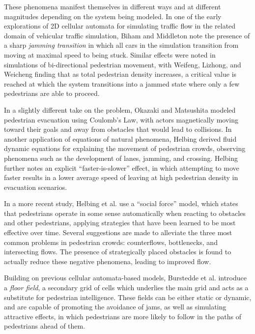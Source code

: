 \documentclass[12pt]{article}
\begin{document}
These phenomena manifest themselves in different ways and at different
magnitudes depending on the system being modeled. In one of the early
explorations of 2D cellular automata for simulating traffic flow in the related
domain of vehicular traffic simulation, Biham and Middleton \cite{biham1992self}
note the presence of a sharp
\textit{jamming transition} in which all cars in the simulation transition from
moving at maximal speed to being stuck. Similar effects were noted in
simulations of bi-directional pedestrian movement, with Weifeng, Lizhong, and
Weicheng \cite{weifeng2003simulation} finding that as total pedestrian density
increases, a critical value is reached at which the system transitions into a
jammed state where only a few pedestrians are able to proceed.

In a slightly different take on the problem, Okazaki and Matsushita
\cite{okazaki1993study} modeled pedestrian evacuation using Coulomb's Law, with
actors magnetically moving toward their goals and away from obstacles that would
lead to collisions. In another application of equations of natural phenomena,
Helbing \cite{helbing1998fluid} derived fluid dynamic equations for explaining
the movement of pedestrian crowds, observing phenomena such as the development
of lanes, jamming, and crossing. Helbing \cite{helbing2000simulating} further
notes an explicit ``faster-is-slower'' effect, in which attempting to move faster
results in a lower average speed of leaving at high pedestrian density in
evacuation scenarios.

In a more recent study, Helbing et al. \cite{helbing2005self} use a
``social force'' model, which states that pedestrians operate in some sense
automatically when reacting to obstacles and other pedestrians, applying
strategies that have been learned to be most effective over time. Several
suggestions are made to alleviate the three most common problems in pedestrian
crowds: counterflows, bottlenecks, and intersecting flows. The presence of
strategically placed obstacles is found to actually reduce these negative
phenomena, leading to improved flow.

Building on previous cellular automata-based models, Burstedde et al.
\cite{burstedde2001simulation} introduce a \textit{floor field}, a secondary
grid of cells which underlies the main grid and acts as a substitute for
pedestrian intelligence. These fields can be either static or dynamic, and are
capable of promoting the avoidance of jams, as well as simulating attractive
effects, in which pedestrians are more likely to follow in the paths of
pedestrians ahead of them.
\end{document}
